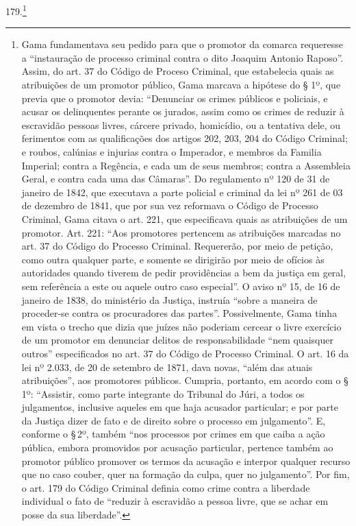 179.\footnote{Gama fundamentava seu pedido para que o promotor da
  comarca requeresse a ``instauração de processo criminal contra o dito
  Joaquim Antonio Raposo''. Assim, do art. 37 do Código de Proceso
  Criminal, que estabelecia quais as atribuições de um promotor público,
  Gama marcava a hipótese do § 1º, que previa que o promotor devia:
  ``Denunciar os crimes públicos e policiais, e acusar os delinquentes
  perante os jurados, assim como os crimes de reduzir à escravidão
  pessoas livres, cárcere privado, homicídio, ou a tentativa dele, ou
  ferimentos com as qualificações dos artigos 202, 203, 204 do Código
  Criminal; e roubos, calúnias e injurias contra o Imperador, e membros
  da Familia Imperial; contra a Regência, e cada um de seus membros;
  contra a Assembleia Geral, e contra cada uma das Câmaras''. Do
  regulamento nº 120 de 31 de janeiro de 1842, que executava a parte policial e
  criminal da lei nº 261 de 03 de dezembro de 1841, que por sua vez reformava o
  Código de Processo Criminal, Gama citava o art. 221, que especificava
  quais as atribuições de um promotor. Art. 221: ``Aos promotores
  pertencem as atribuições marcadas no art. 37 do Código do Processo
  Criminal. Requererão, por meio de petição, como outra qualquer parte,
  e somente se dirigirão por meio de ofícios às autoridades quando
  tiverem de pedir providências a bem da justiça em geral, sem
  referência a este ou aquele outro caso especial''. O aviso nº 15, de
  16 de janeiro de 1838, do ministério da Justiça, instruía ``sobre a maneira de
  proceder-se contra os procuradores das partes''. Possivelmente, Gama
  tinha em vista o trecho que dizia que juízes não poderiam cercear o
  livre exercício de um promotor em denunciar delitos de
  responsabilidade ``nem quaisquer outros'' especificados no art. 37 do
  Código de Processo Criminal. O art. 16 da lei nº 2.033, de 20 de setembro de 1871,
  dava novas, ``além das atuais atribuições'', aos promotores públicos.
  Cumpria, portanto, em acordo com o § 1º: ``Assistir, como parte
  integrante do Tribunal do Júri, a todos os julgamentos, inclusive
  aqueles em que haja acusador particular; e por parte da Justiça dizer
  de fato e de direito sobre o processo em julgamento''. E, conforme o §\,2º, também ``nos processos por crimes em que caiba a ação pública,
  embora promovidos por acusação particular, pertence também ao promotor
  público promover os termos da acusação e interpor qualquer recurso que
  no caso couber, quer na formação da culpa, quer no julgamento''. Por
  fim, o art. 179 do Código Criminal definia como crime contra a
  liberdade individual o fato de ``reduzir à escravidão a pessoa livre,
  que se achar em posse da sua liberdade''.}

